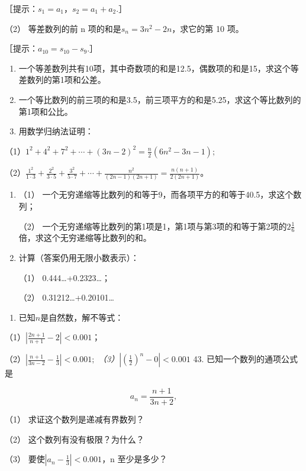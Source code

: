 ［提示：\(s_{1}=a_{1}\)，\(s_{2}=a_{1}+a_{2}\).］

（2） 等差数列的前 n 项的和是\(s_{n}=3n^{2}-2n\)，求它的第 10 项。

［提示：\(a_{10}=s_{10}-s_{9}\).］

\begin{enumerate}[start=37]
\item
  一个等差数列共有10项，其中奇数项的和是12.5，偶数项的和是15，求这个等差数列的第1项和公差。
\item
  一个等比数列的前三项的和是3.5，前三项平方的和是5.25，求这个等比数列的第1项和公比。
\item
  用数学归纳法证明：
\end{enumerate}

（1）\(1^{2}+4^{2}+7^{2}+\cdots+(3n-2)^{2}=\frac{n}{2}(6n^{2}-3n-1);\)

（2）\(\frac{1^2}{1 \cdot 3} + \frac{2^2}{3 \cdot 5} + \frac{3^2}{5 \cdot 7} + \cdots + \frac{n^2}{(2n-1)(2n+1)} = \frac{n(n+1)}{2(2n+1)}\)。

\begin{enumerate}[start=40,label={*\arabic*.}]
\item
  （1）
一个无穷递缩等比数列的和等于9，而各项平方的和等于40.5，求这个数列；

（2）
一个无穷递缩等比数列的第1项是1，第1项与第3项的和等于第2项的\(2\frac{1}{6}\)倍，求这个无穷递缩等比数列的和。

\item
  计算（答案仍用无限小数表示）：

（1） 0.444\ldots+0.2323\ldots；

（2） 0.31212\ldots+0.20101\ldots{}

\end{enumerate}
\begin{enumerate}[start=42]
\item
  已知\(n\)是自然数，解不等式：
\end{enumerate}

（1）\(\left|\frac{2n + 1}{n + 1} - 2\right| < 0.001\)；

（2）\(\left|\frac{n+1}{3n-2}-\frac{1}{3}\right|<0.001;\)
\emph{（3）\(\left|\left(\frac{1}{2}\right)^{n}-0\right|<0.001\) }43.
已知一个数列的通项公式是

\[
a_{n} = \frac{n + 1}{3 n + 2},
\]

（1） 求证这个数列是递减有界数列？

（2） 这个数列有没有极限？为什么？

（3） 要使\(\left|a_{n}-\frac{1}{3}\right|<0.001\)，n 至少是多少？

